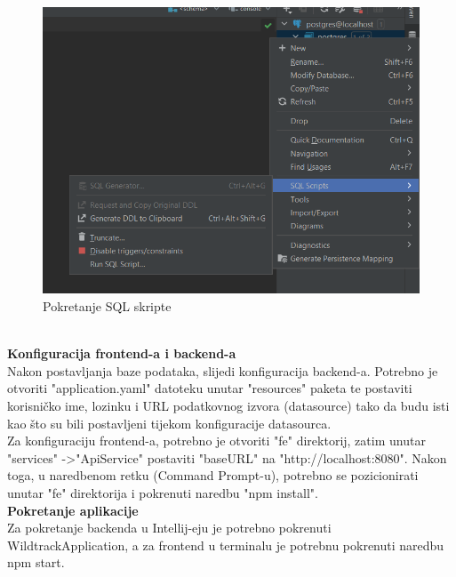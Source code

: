 			\begin{figure}[H]
				\includegraphics[scale=0.3]{slike/runSqlScript.png} 
				\centering
				\caption{Pokretanje SQL skripte}
				\label{fig:promjene}
			\end{figure}
			\\
			\textbf{Konfiguracija frontend-a i backend-a}
			\\
			Nakon postavljanja baze podataka, slijedi konfiguracija backend-a. Potrebno je otvoriti "application.yaml" datoteku unutar "resources" paketa te postaviti korisničko ime, lozinku i URL podatkovnog izvora (datasource) tako da budu isti kao što su bili postavljeni tijekom konfiguracije datasourca.
			\\
			Za konfiguraciju frontend-a, potrebno je otvoriti "fe" direktorij, zatim unutar "services" -\textgreater "ApiService" postaviti "baseURL" na "http://localhost:8080". Nakon toga, u naredbenom retku (Command Prompt-u), potrebno se pozicionirati unutar "fe" direktorija i pokrenuti naredbu "npm install".
			\\
			\textbf{Pokretanje aplikacije}
			\\
			Za pokretanje backenda u Intellij-eju je potrebno pokrenuti WildtrackApplication, a za frontend u terminalu je potrebnu pokrenuti naredbu npm start.